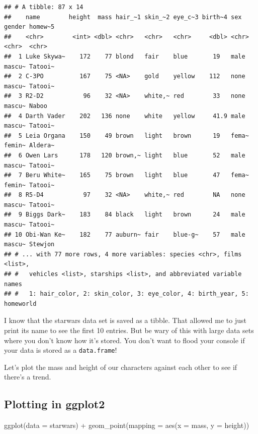\documentclass[
]{book}
\newenvironment{Shaded}{\begin{snugshade}}{\end{snugshade}}
\newcommand{\AttributeTok}[1]{\textcolor[rgb]{0.77,0.63,0.00}{#1}}
\newcommand{\FunctionTok}[1]{\textcolor[rgb]{0.00,0.00,0.00}{#1}}
\newcommand{\NormalTok}[1]{#1}
\newcommand{\SpecialCharTok}[1]{\textcolor[rgb]{0.00,0.00,0.00}{#1}}
\begin{document}
\begin{verbatim}
## # A tibble: 87 x 14
##    name        height  mass hair_~1 skin_~2 eye_c~3 birth~4 sex   gender homew~5
##    <chr>        <int> <dbl> <chr>   <chr>   <chr>     <dbl> <chr> <chr>  <chr>  
##  1 Luke Skywa~    172    77 blond   fair    blue       19   male  mascu~ Tatooi~
##  2 C-3PO          167    75 <NA>    gold    yellow    112   none  mascu~ Tatooi~
##  3 R2-D2           96    32 <NA>    white,~ red        33   none  mascu~ Naboo  
##  4 Darth Vader    202   136 none    white   yellow     41.9 male  mascu~ Tatooi~
##  5 Leia Organa    150    49 brown   light   brown      19   fema~ femin~ Aldera~
##  6 Owen Lars      178   120 brown,~ light   blue       52   male  mascu~ Tatooi~
##  7 Beru White~    165    75 brown   light   blue       47   fema~ femin~ Tatooi~
##  8 R5-D4           97    32 <NA>    white,~ red        NA   none  mascu~ Tatooi~
##  9 Biggs Dark~    183    84 black   light   brown      24   male  mascu~ Tatooi~
## 10 Obi-Wan Ke~    182    77 auburn~ fair    blue-g~    57   male  mascu~ Stewjon
## # ... with 77 more rows, 4 more variables: species <chr>, films <list>,
## #   vehicles <list>, starships <list>, and abbreviated variable names
## #   1: hair_color, 2: skin_color, 3: eye_color, 4: birth_year, 5: homeworld
\end{verbatim}

I know that the starwars data set is saved as a tibble. That allowed me to just print its name to see the first 10 entries. But be wary of this with large data sets where you don't know how it's stored. You don't want to flood your console if your data is stored as a \texttt{data.frame}!

Let's plot the mass and height of our characters against each other to see if there's a trend.

\hypertarget{plotting-in-ggplot2}{%
\subsection{Plotting in ggplot2}\label{plotting-in-ggplot2}}

\begin{Shaded}
\begin{Highlighting}[]
\FunctionTok{ggplot}\NormalTok{(}\AttributeTok{data =}\NormalTok{ starwars) }\SpecialCharTok{+}
  \FunctionTok{geom\_point}\NormalTok{(}\AttributeTok{mapping =} \FunctionTok{aes}\NormalTok{(}\AttributeTok{x =}\NormalTok{ mass, }\AttributeTok{y =}\NormalTok{ height))}
\end{Highlighting}
\end{Shaded}
\end{document}
